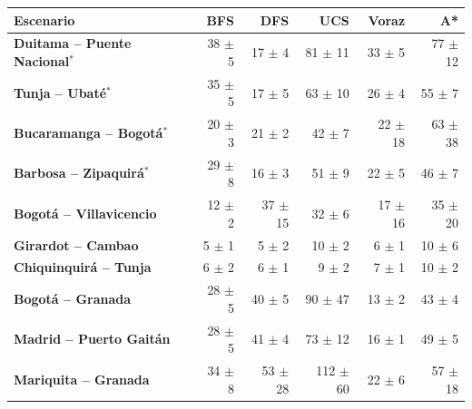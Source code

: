 \renewcommand{\arraystretch}{1.2}
\begin{tabular}{|l|r|r|r|r|r|}
\hline
\rowcolor{gray!20} \textbf{Escenario} & \textbf{BFS} & \textbf{DFS} & \textbf{UCS} & \textbf{Voraz} & \textbf{A*} \\
\hline
\textbf{Duitama -- Puente Nacional$^{*}$} & 38 $\pm$ 5 & 17 $\pm$ 4 & 81 $\pm$ 11 & 33 $\pm$ 5 & 77 $\pm$ 12 \\
\hline
\textbf{Tunja -- Ubaté$^{*}$} & 35 $\pm$ 5 & 17 $\pm$ 5 & 63 $\pm$ 10 & 26 $\pm$ 4 & 55 $\pm$ 7 \\
\hline
\textbf{Bucaramanga -- Bogotá$^{*}$} & 20 $\pm$ 3 & 21 $\pm$ 2 & 42 $\pm$ 7 & 22 $\pm$ 18 & 63 $\pm$ 38 \\
\hline
\textbf{Barbosa -- Zipaquirá$^{*}$} & 29 $\pm$ 8 & 16 $\pm$ 3 & 51 $\pm$ 9 & 22 $\pm$ 5 & 46 $\pm$ 7 \\
\hline
\textbf{Bogotá -- Villavicencio} & 12 $\pm$ 2 & 37 $\pm$ 15 & 32 $\pm$ 6 & 17 $\pm$ 16 & 35 $\pm$ 20 \\
\hline
\textbf{Girardot -- Cambao} & 5 $\pm$ 1 & 5 $\pm$ 2 & 10 $\pm$ 2 & 6 $\pm$ 1 & 10 $\pm$ 6 \\
\hline
\textbf{Chiquinquirá -- Tunja} & 6 $\pm$ 2 & 6 $\pm$ 1 & 9 $\pm$ 2 & 7 $\pm$ 1 & 10 $\pm$ 2 \\
\hline
\textbf{Bogotá -- Granada} & 28 $\pm$ 5 & 40 $\pm$ 5 & 90 $\pm$ 47 & 13 $\pm$ 2 & 43 $\pm$ 4 \\
\hline
\textbf{Madrid -- Puerto Gaitán} & 28 $\pm$ 5 & 41 $\pm$ 4 & 73 $\pm$ 12 & 16 $\pm$ 1 & 49 $\pm$ 5 \\
\hline
\textbf{Mariquita -- Granada} & 34 $\pm$ 8 & 53 $\pm$ 28 & 112 $\pm$ 60 & 22 $\pm$ 6 & 57 $\pm$ 18 \\
\hline
\end{tabular}
